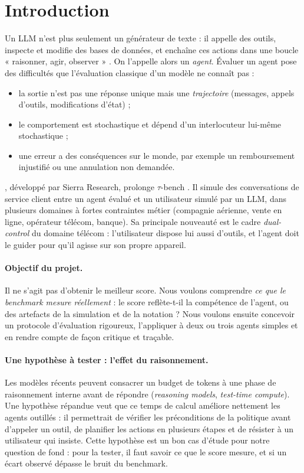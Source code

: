 \section{Introduction}

Un LLM n'est plus seulement un générateur de texte : il appelle des outils, inspecte et modifie des bases de données, et enchaîne ces actions dans une boucle « raisonner, agir, observer » \cite{yao2023react}. On l'appelle alors un \emph{agent}. Évaluer un agent pose des difficultés que l'évaluation classique d'un modèle ne connaît pas :
\begin{itemize}[nosep]
  \item la sortie n'est pas une réponse unique mais une \emph{trajectoire} (messages, appels d'outils, modifications d'état) ;
  \item le comportement est stochastique et dépend d'un interlocuteur lui-même stochastique ;
  \item une erreur a des conséquences sur le monde, par exemple un remboursement injustifié ou une annulation non demandée.
\end{itemize}

\taub{} \cite{barres2025tau2}, développé par Sierra Research, prolonge $\tau$-bench \cite{yao2024taubench}. Il simule des conversations de service client entre un agent évalué et un utilisateur simulé par un LLM, dans plusieurs domaines à fortes contraintes métier (compagnie aérienne, vente en ligne, opérateur télécom, banque). Sa principale nouveauté est le cadre \emph{dual-control} du domaine télécom : l'utilisateur dispose lui aussi d'outils, et l'agent doit le guider pour qu'il agisse sur son propre appareil.

\paragraph{Objectif du projet.} Il ne s'agit pas d'obtenir le meilleur score. Nous voulons comprendre \emph{ce que le benchmark mesure réellement} : le score reflète-t-il la compétence de l'agent, ou des artefacts de la simulation et de la notation ? Nous voulons ensuite concevoir un protocole d'évaluation rigoureux, l'appliquer à deux ou trois agents simples et en rendre compte de façon critique et traçable.

\paragraph{Une hypothèse à tester : l'effet du raisonnement.} Les modèles récents peuvent consacrer un budget de tokens à une phase de raisonnement interne avant de répondre (\emph{reasoning models}, \emph{test-time compute}). Une hypothèse répandue veut que ce temps de calcul améliore nettement les agents outillés : il permettrait de vérifier les préconditions de la politique avant d'appeler un outil, de planifier les actions en plusieurs étapes et de résister à un utilisateur qui insiste. Cette hypothèse est un bon cas d'étude pour notre question de fond : pour la tester, il faut savoir ce que le score mesure, et si un écart observé dépasse le bruit du benchmark.

